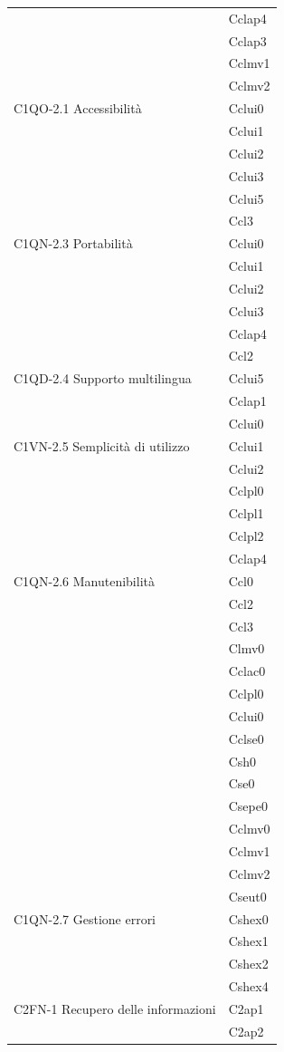 \begin{footnotesize}
\begin{longtable}[!h]{|l|l|}
& Cclap4\\
& Cclap3\\
& Cclmv1\\
& Cclmv2\\\hline  
C1QO-2.1 Accessibilit\`a & Cclui0\\
& Cclui1\\
& Cclui2\\
& Cclui3\\
& Cclui5\\
& Ccl3\\\hline 
C1QN-2.3 Portabilit\`a & Cclui0\\
& Cclui1\\
& Cclui2\\
& Cclui3\\
& Cclap4\\
& Ccl2\\\hline   
C1QD-2.4 Supporto multilingua & Cclui5\\    
& Cclap1\\
& Cclui0\\\hline                
C1VN-2.5 Semplicit\`a di utilizzo & Cclui1\\
& Cclui2\\
& Cclpl0\\
& Cclpl1\\
& Cclpl2\\
& Cclap4\\\hline
C1QN-2.6 Manutenibilit\`a & Ccl0\\
& Ccl2\\
& Ccl3\\
& Clmv0\\
& Cclac0\\
& Cclpl0\\
& Cclui0\\
& Cclse0\\
& Csh0\\
& Cse0\\
& Csepe0\\
& Cclmv0\\
& Cclmv1\\
& Cclmv2\\
& Cseut0\\\hline                    
C1QN-2.7 Gestione errori  & Cshex0\\
& Cshex1\\
& Cshex2\\
& Cshex4\\\hline     
C2FN-1 Recupero delle informazioni & C2ap1 \\
& C2ap2\\\hline  

\end{longtable}
\end{footnotesize}
